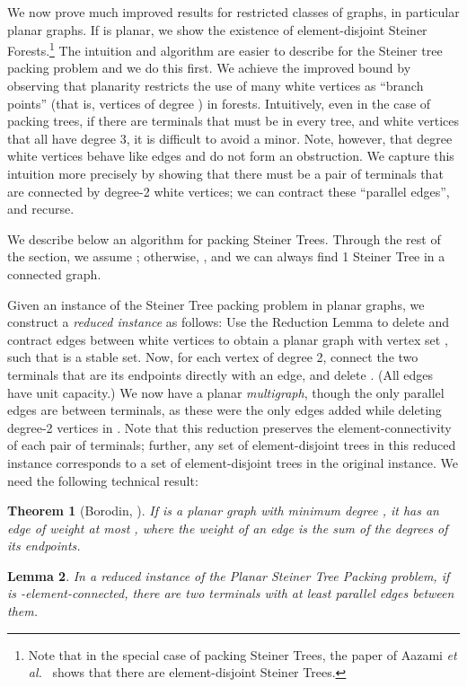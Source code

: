 \documentclass[11pt]{article}
\newtheorem{lemma}{Lemma}[section]
\newtheorem{theorem}[lemma]{Theorem}
\newcommand{\etal}{{\em et al.}\ }
\begin{document}
We now prove much improved results for restricted classes of graphs,
in particular planar graphs. If  is planar, we show the existence
of  element-disjoint Steiner Forests.\footnote{Note
  that in the special case of packing Steiner Trees, the paper of
  Aazami \etal \cite{ACJ08} shows that there are 
  element-disjoint Steiner Trees.} The intuition and algorithm are
easier to describe for the Steiner tree packing problem and we do this
first. We achieve the improved bound by observing that planarity
restricts the use of many white vertices as ``branch points'' (that
is, vertices of degree ) in forests. Intuitively, even in the
case of packing trees, if there are terminals 
that must be in every tree, and white vertices 
that all have degree 3, it is difficult to avoid a 
minor. Note, however, that degree  white vertices behave like edges
and do not form an obstruction.  We capture this intuition more
precisely by showing that there must be a pair of terminals 
that are connected by  degree-2 white vertices; we can
contract these ``parallel edges'', and recurse.

We describe below an algorithm for packing Steiner Trees.  Through the
rest of the section, we assume ; otherwise, , and we can always find 1 Steiner Tree in a connected graph.

Given an instance of the Steiner Tree packing problem in planar
graphs, we construct a \emph{reduced instance} as follows: Use the
Reduction Lemma to delete and contract edges between white vertices to
obtain a planar graph with vertex set , such that  is a
stable set. Now, for each vertex  of degree 2, connect the
two terminals that are its endpoints directly with an edge, and delete
. (All edges have unit capacity.)  We now have a planar
\emph{multigraph}, though the only parallel edges are between
terminals, as these were the only edges added while deleting degree-2
vertices in . Note that this reduction preserves the
element-connectivity of each pair of terminals; further, any set of
element-disjoint trees in this reduced instance corresponds to a set
of element-disjoint trees in the original instance. We need the
following technical result:

\begin{theorem}[Borodin, \cite {Borodin}]
  \label{thm:Borodin}
  If  is a planar graph with minimum degree , it has an edge of
  weight at most , where the weight of an edge is the sum of the
  degrees of its endpoints.
\end{theorem}

\begin{lemma} \label{lem:parallelEdges} 
  In a reduced instance of the Planar Steiner Tree Packing problem, if
   is -element-connected, there are two terminals 
  with at least  parallel edges between them.
\end{lemma}
\end{document}
